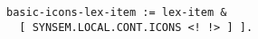 \documentclass[a4paper]{article}
\begin{document}
{\small\begin{verbatim}
basic-icons-lex-item := lex-item &
  [ SYNSEM.LOCAL.CONT.ICONS <! !> ] ].
\end{verbatim}}
\end{document}

